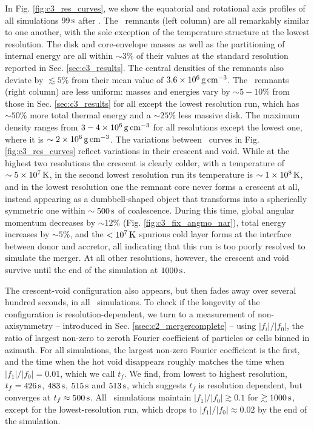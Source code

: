 In Fig. \ref{fig:c3_res_curves}, we show the equatorial and rotational axis profiles of all simulations $99\,\mathrm{s}$ after \tcoal.  The \gasoline\ remnants (left column) are all remarkably similar to one another, with the sole exception of the temperature structure at the lowest resolution.  The disk and core-envelope masses as well as the partitioning of internal energy are all within $\sim3$\% of their values at the standard resolution reported in Sec. \ref{sec:c3_results}.  The central densities of the remnants also deviate by $\lesssim5$\% from their mean value of $3.6\times10^{6}\,\gcc$.  The \arepo\ remnants (right column) are less uniform: masses and energies vary by $\sim5-10$\% from those in Sec. \ref{sec:c3_results} for all except the lowest resolution run, which has $\sim50$\% more total thermal energy and a $\sim25$\% less massive disk.  The maximum density ranges from $3-4\times10^6\,\gcc$ for all resolutions except the lowest one, where it is $\sim2\times10^6\,\gcc$.  The variations between \arepo\ curves in Fig. \ref{fig:c3_res_curves} reflect variations in their crescent and void.  While at the highest two resolutions the crescent is clearly colder, with a temperature of $\sim5\times10^7\,\mathrm{K}$, in the second lowest resolution run its temperature is $\sim1\times10^8\,\mathrm{K}$, and in the lowest resolution one the remnant core never forms a crescent at all, instead appearing as a dumbbell-shaped object that transforms into a spherically symmetric one within $\sim500\,\mathrm{s}$ of coalescence.  During this time, global angular momentum decreases by $\sim12$\% (Fig. \ref{fig:c3_fix_angmo_nar}), total energy increases by $\sim5$\%, and the $<10^7\,\mathrm{K}$ spurious cold layer forms at the interface between donor and accretor, all indicating that this run is too poorly resolved to simulate the merger.  At all other resolutions, however, the crescent and void survive until the end of the simulation at $1000\,\mathrm{s}$.

The crescent-void configuration also appears, but then fades away over several hundred seconds, in all \gasoline\ simulations.  To check if the longevity of the configuration is resolution-dependent, we turn to a measurement of non-axisymmetry -- introduced in Sec. \ref{ssec:c2_mergercomplete} -- using $|f_i|/|f_0|$, the ratio of largest non-zero to zeroth Fourier coefficient of particles or cells binned in azimuth.  For all simulations, the largest non-zero Fourier coefficient is the first, and the time when the hot void disappears roughly matches the time when $|f_1|/|f_0| = 0.01$, which we call $t_f$.  We find, from lowest to highest resolution, $t_f = 426\,\mathrm{s}$, $483\,\mathrm{s}$, $515\,\mathrm{s}$ and $513\,\mathrm{s}$, which suggests $t_f$ is resolution dependent, but converges at $t_f \approx 500\,\mathrm{s}$.   All \arepo\ simulations maintain $|f_1|/|f_0| \gtrsim 0.1$ for $\gtrsim 1000\,\mathrm{s}$, except for the lowest-resolution run, which drops to $|f_1|/|f_0| \approx 0.02$ by the end of the simulation.


